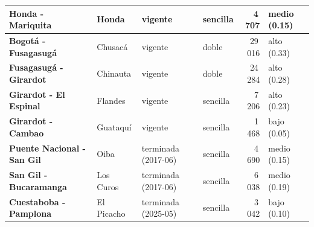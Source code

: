 \begin{tabular}{|>{\raggedright\arraybackslash}p{3.5cm}|>{\raggedright\arraybackslash}p{2.0cm}|>{\raggedright\arraybackslash}p{2.5cm}|l|r|>{\raggedright\arraybackslash}p{2.1cm}|}
\hline
\textbf{Honda - Mariquita} & Honda & vigente & sencilla & 4\,707 & medio (0.15) \\
\hline
\textbf{Bogotá - Fusagasugá} & Chusacá & vigente & doble & 29\,016 & alto (0.33) \\
\hline
\textbf{Fusagasugá - Girardot} & Chinauta & vigente & doble & 24\,284 & alto (0.28) \\
\hline
\textbf{Girardot - El Espinal} & Flandes & vigente & sencilla & 7\,206 & alto (0.23) \\
\hline
\textbf{Girardot - Cambao} & Guataquí & vigente & sencilla & 1\,468 & bajo (0.05) \\
\hline
\textbf{Puente Nacional - San Gil} & Oiba & terminada (2017-06) & sencilla & 4\,690 & medio (0.15) \\
\hline
\textbf{San Gil - Bucaramanga} & Los Curos & terminada (2017-06) & sencilla & 6\,038 & medio (0.19) \\
\hline
\textbf{Cuestaboba - Pamplona} & El Picacho & terminada (2025-05) & sencilla & 3\,042 & bajo (0.10) \\
\hline
\end{tabular}
